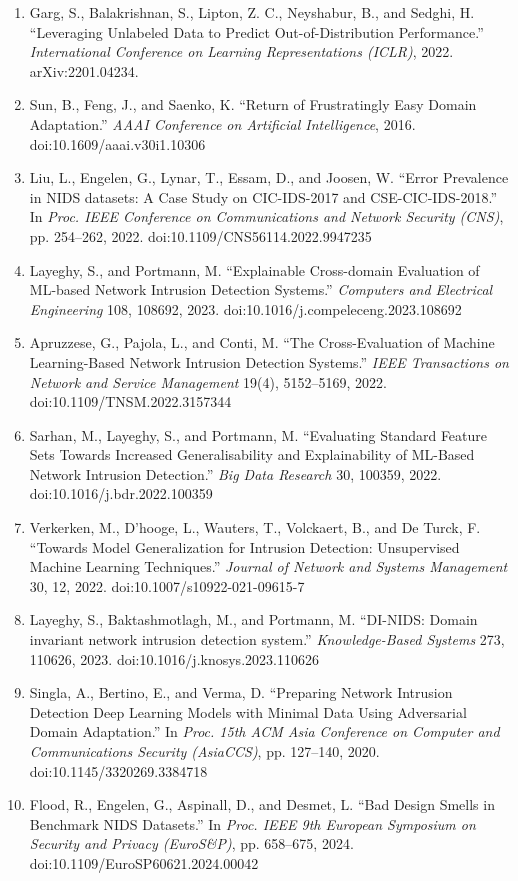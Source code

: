 \documentclass[11pt,a4paper]{article}
\begin{document}
\begin{enumerate}[leftmargin=*,itemsep=2pt]
\item Garg, S., Balakrishnan, S., Lipton, Z. C., Neyshabur, B., and Sedghi, H. ``Leveraging Unlabeled Data to Predict Out-of-Distribution Performance.'' \emph{International Conference on Learning Representations (ICLR)}, 2022. arXiv:2201.04234.
\item Sun, B., Feng, J., and Saenko, K. ``Return of Frustratingly Easy Domain Adaptation.'' \emph{AAAI Conference on Artificial Intelligence}, 2016. doi:10.1609/aaai.v30i1.10306
\item Liu, L., Engelen, G., Lynar, T., Essam, D., and Joosen, W. ``Error Prevalence in NIDS datasets: A Case Study on CIC-IDS-2017 and CSE-CIC-IDS-2018.'' In \emph{Proc. IEEE Conference on Communications and Network Security (CNS)}, pp. 254--262, 2022. doi:10.1109/CNS56114.2022.9947235
\item Layeghy, S., and Portmann, M. ``Explainable Cross-domain Evaluation of ML-based Network Intrusion Detection Systems.'' \emph{Computers and Electrical Engineering} 108, 108692, 2023. doi:10.1016/j.compeleceng.2023.108692
\item Apruzzese, G., Pajola, L., and Conti, M. ``The Cross-Evaluation of Machine Learning-Based Network Intrusion Detection Systems.'' \emph{IEEE Transactions on Network and Service Management} 19(4), 5152--5169, 2022. doi:10.1109/TNSM.2022.3157344
\item Sarhan, M., Layeghy, S., and Portmann, M. ``Evaluating Standard Feature Sets Towards Increased Generalisability and Explainability of ML-Based Network Intrusion Detection.'' \emph{Big Data Research} 30, 100359, 2022. doi:10.1016/j.bdr.2022.100359
\item Verkerken, M., D'hooge, L., Wauters, T., Volckaert, B., and De Turck, F. ``Towards Model Generalization for Intrusion Detection: Unsupervised Machine Learning Techniques.'' \emph{Journal of Network and Systems Management} 30, 12, 2022. doi:10.1007/s10922-021-09615-7
\item Layeghy, S., Baktashmotlagh, M., and Portmann, M. ``DI-NIDS: Domain invariant network intrusion detection system.'' \emph{Knowledge-Based Systems} 273, 110626, 2023. doi:10.1016/j.knosys.2023.110626
\item Singla, A., Bertino, E., and Verma, D. ``Preparing Network Intrusion Detection Deep Learning Models with Minimal Data Using Adversarial Domain Adaptation.'' In \emph{Proc. 15th ACM Asia Conference on Computer and Communications Security (AsiaCCS)}, pp. 127--140, 2020. doi:10.1145/3320269.3384718
\item Flood, R., Engelen, G., Aspinall, D., and Desmet, L. ``Bad Design Smells in Benchmark NIDS Datasets.'' In \emph{Proc. IEEE 9th European Symposium on Security and Privacy (EuroS\&P)}, pp. 658--675, 2024. doi:10.1109/EuroSP60621.2024.00042

\end{enumerate}
\end{document}
